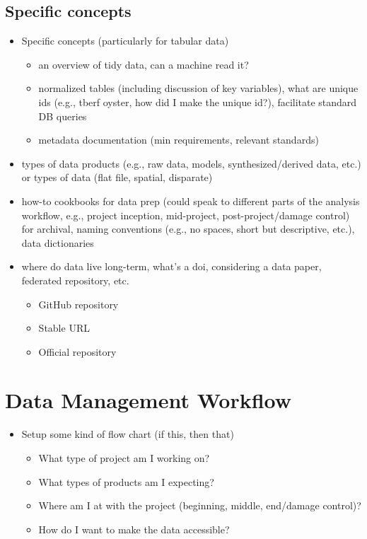 \documentclass[
]{book}
\providecommand{\tightlist}{%
  \setlength{\itemsep}{0pt}\setlength{\parskip}{0pt}}
\begin{document}
\hypertarget{specific-concepts}{%
\section{Specific concepts}\label{specific-concepts}}

\begin{itemize}
\tightlist
\item
  Specific concepts (particularly for tabular data)

  \begin{itemize}
  \tightlist
  \item
    an overview of tidy data, can a machine read it?
  \item
    normalized tables (including discussion of key variables), what are unique ids (e.g., tberf oyster, how did I make the unique id?), facilitate standard DB queries
  \item
    metadata documentation (min requirements, relevant standards)
  \end{itemize}
\item
  types of data products (e.g., raw data, models, synthesized/derived data, etc.) or types of data (flat file, spatial, disparate)
\item
  how-to cookbooks for data prep (could speak to different parts of the analysis workflow, e.g., project inception, mid-project, post-project/damage control) for archival, naming conventions (e.g., no spaces, short but descriptive, etc.), data dictionaries
\item
  where do data live long-term, what's a doi, considering a data paper, federated repository, etc.

  \begin{itemize}
  \tightlist
  \item
    GitHub repository
  \item
    Stable URL
  \item
    Official repository
  \end{itemize}
\end{itemize}

\hypertarget{workflow}{%
\chapter{Data Management Workflow}\label{workflow}}

\begin{itemize}
\tightlist
\item
  Setup some kind of flow chart (if this, then that)

  \begin{itemize}
  \tightlist
  \item
    What type of project am I working on?
  \item
    What types of products am I expecting?
  \item
    Where am I at with the project (beginning, middle, end/damage control)?
  \item
    How do I want to make the data accessible?
  \end{itemize}
\end{itemize}
\end{document}
